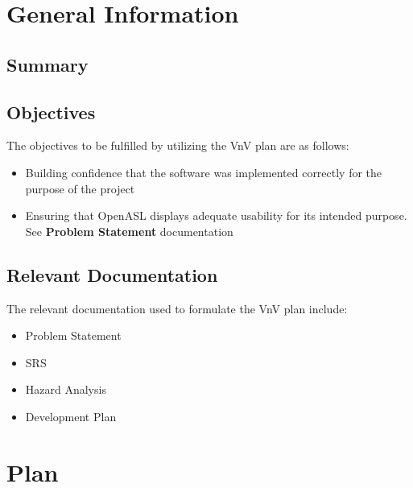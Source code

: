 \documentclass[12pt]{article}
\begin{document}
\newpage


\section{General Information}

\subsection{Summary}


\subsection{Objectives}

The objectives to be fulfilled by utilizing the VnV plan are as follows:\\
\begin{itemize}
  \item Building confidence that the software was implemented correctly for the purpose of the project
  \item Ensuring that OpenASL displays adequate usability for its intended purpose. See \textbf{Problem Statement} documentation
\end{itemize}

\subsection{Relevant Documentation}

The relevant documentation used to formulate the VnV plan include:\\
\begin{itemize}
  \item Problem Statement
  \item SRS
  \item Hazard Analysis
  \item Development Plan
\end{itemize}

\section{Plan}

\end{document}
